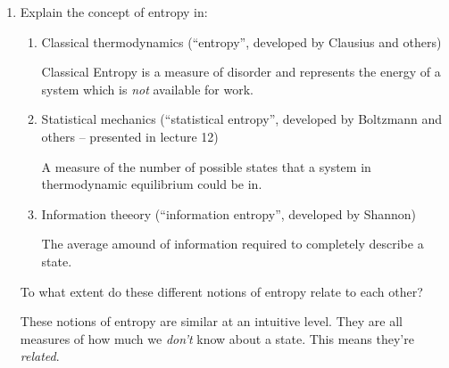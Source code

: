 \documentclass[10pt,\jkfside,a4paper]{article}
\begin{document}
\begin{enumerate}
\begin{enumerate}
    \end{enumerate}

    \item Explain the concept of entropy in:

    \begin{enumerate}

        \item Classical thermodynamics (``entropy'', developed by Clausius and others)

        Classical Entropy is a measure of disorder and represents the energy of a system which is \emph{not} available for work.

        \item Statistical mechanics (``statistical entropy'', developed by Boltzmann and others -- presented in lecture 12)

        A measure of the number of possible states that a system in thermodynamic equilibrium could be in.

        \item Information theeory (``information entropy'', developed by Shannon)

        The average amound of information required to completely describe a state.

    \end{enumerate}

    To what extent do these different notions of entropy relate to each other?

    These notions of entropy are similar at an intuitive level. They are all measures of how much we \emph{don't} know about a state. This means they're \emph{related}.

\end{enumerate}
\end{document}

